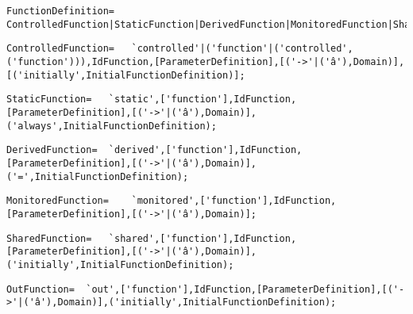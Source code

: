 \documentclass{article}
\begin{document}
    \begin{flushleft}
    \begin{lstlisting}[mathescape=true, breaklines=true]
      FunctionDefinition= 	ControlledFunction|StaticFunction|DerivedFunction|MonitoredFunction|SharedFunction|OutFunction;
    \end{lstlisting}
    \end{flushleft}
    \begin{flushleft}
    \begin{lstlisting}[mathescape=true, breaklines=true]
      ControlledFunction= 	`controlled'|('function'|('controlled',('function'))),IdFunction,[ParameterDefinition],[('->'|('â'),Domain)],[('initially',InitialFunctionDefinition)];
    \end{lstlisting}
    \end{flushleft}
    \begin{flushleft}
    \begin{lstlisting}[mathescape=true, breaklines=true]
      StaticFunction= 	`static',['function'],IdFunction,[ParameterDefinition],[('->'|('â'),Domain)],('always',InitialFunctionDefinition);
    \end{lstlisting}
    \end{flushleft}
    \begin{flushleft}
    \begin{lstlisting}[mathescape=true, breaklines=true]
      DerivedFunction= 	`derived',['function'],IdFunction,[ParameterDefinition],[('->'|('â'),Domain)],('=',InitialFunctionDefinition);
    \end{lstlisting}
    \end{flushleft}
    \begin{flushleft}
    \begin{lstlisting}[mathescape=true, breaklines=true]
      MonitoredFunction= 	`monitored',['function'],IdFunction,[ParameterDefinition],[('->'|('â'),Domain)];
    \end{lstlisting}
    \end{flushleft}
    \begin{flushleft}
    \begin{lstlisting}[mathescape=true, breaklines=true]
      SharedFunction= 	`shared',['function'],IdFunction,[ParameterDefinition],[('->'|('â'),Domain)],('initially',InitialFunctionDefinition);
    \end{lstlisting}
    \end{flushleft}
    \begin{flushleft}
    \begin{lstlisting}[mathescape=true, breaklines=true]
      OutFunction= 	`out',['function'],IdFunction,[ParameterDefinition],[('->'|('â'),Domain)],('initially',InitialFunctionDefinition);
    \end{lstlisting}
    \end{flushleft}
\end{document}
